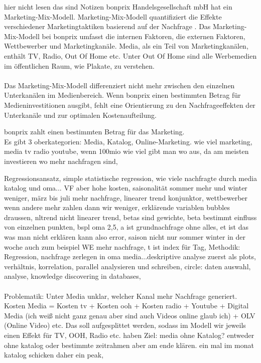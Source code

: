 \iffalse
hier nicht lesen das sind Notizen
bonprix Handelsgesellschaft mbH hat ein Marketing-Mix-Modell. Marketing-Mix-Modell quantifiziert die Effekte verschiedener Marketingtaktiken basierend auf der Nachfrage \cite{MMMdef}. Das Marketing-Mix-Modell bei bonprix umfasst die internen Faktoren, die externen Faktoren, Wettbewerber und Marketingkanäle. Media, als ein Teil von Marketingkanälen, enthält TV, Radio, Out Of Home etc. Unter Out Of Home sind alle Werbemedien im öffentlichen Raum, wie Plakate, zu verstehen. \\\\
Das Marketing-Mix-Modell differenziert nicht mehr zwischen den einzelnen Unterkanälen im Medienbereich. Wenn bonprix einen bestimmten Betrag für Medieninvestitionen ausgibt, fehlt eine Orientierung zu den Nachfrageeffekten der Unterkanäle und zur optimalen Kostenaufteilung.

bonprix zahlt einen bestimmten Betrag für das Marketing. \\ 
Es gibt 3 oberkategorien: Media, Katalog, Online-Marketing. wie viel marketing, media tv radio youtube, wenn 100mio wie viel gibt man wo aus, da am meisten investieren wo mehr nachfragen sind, 

Regressionsansatz, simple statistische regression, wie viele nachfragte durch media katalog und oma... VF aber hohe kosten, saisonalität sommer mehr und winter weniger, märz bis juli mehr nachfrage, linearer trend konjunktor, wettbewerber wenn andere mehr zahlen dann wir weniger, erklärende variablen bubbles draussen, nltrend nicht linearer trend, betas sind gewichte, beta bestimmt einfluss von einzelnen punkten, bspl oma 2,5, a ist grundnachfrage ohne alles, et ist das was man nicht erklären kann also error, saison nicht nur sommer winter in der woche auch zum beispiel WE mehr nachfrage, t ist index für Tag,
Methodik: Regression, nachfrage zerlegen in oma media...deskriptive analyse zuerst als plots, verhältnis, korrelation, parallel analysieren und schreiben, circle: daten auswahl, analyse, knowledge discovering in databases, \\ \\
Problematik: Unter Media unklar, welcher Kanal mehr Nachfrage generiert. Kosten Media = Kosten tv + Kosten ooh + Kosten radio + Youtube + Digital Media (ich weiß nicht ganz genau aber sind auch Videos online glaub ich) + OLV (Online Video) etc.
Das soll aufgesplittet werden, sodass im Modell wir jeweils einen Effekt für TV, OOH, Radio etc. haben
Ziel: media ohne Katalog? entweder ohne katalog oder bestimmte zeitrahmen aber am ende klären.  
ein mal im monat katalog schicken daher ein peak,

